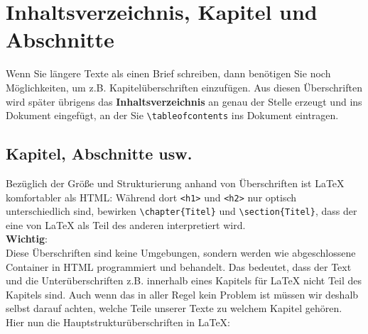 \section{Inhaltsverzeichnis, Kapitel und Abschnitte}

Wenn Sie längere Texte als einen Brief schreiben, dann benötigen Sie noch Möglichkeiten, um z.B. Kapitelüberschriften einzufügen. Aus diesen Überschriften wird später übrigens das \textbf{Inhaltsverzeichnis} an genau der Stelle erzeugt und ins Dokument eingefügt, an der Sie \verb|\tableofcontents| ins Dokument eintragen.

\subsection{Kapitel, Abschnitte usw.}

Bezüglich der Größe und Strukturierung anhand von Überschriften ist LaTeX komfortabler als HTML: Während dort \verb|<h1>| und \verb|<h2>| nur optisch unterschiedlich sind, bewirken \verb|\chapter{Titel}| und \verb|\section{Titel}|, dass der eine von LaTeX als Teil des anderen interpretiert wird.\\

\textbf{Wichtig}:\\

Diese Überschriften sind keine Umgebungen, sondern werden wie abgeschlossene Container in HTML programmiert und behandelt. Das bedeutet, dass der Text und die Unterüberschriften z.B. innerhalb eines Kapitels für LaTeX nicht Teil des Kapitels sind. Auch wenn das in aller Regel kein Problem ist müssen wir deshalb selbst darauf achten, welche Teile unserer Texte zu welchem Kapitel gehören.\\

Hier nun die Hauptstrukturüberschriften in LaTeX:

